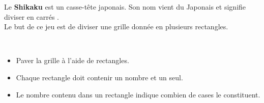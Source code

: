 \begin{changemargin}{-15mm}{-15mm}
\begin{enigme}[Shikaku]
    Le {\bf Shikaku} est un casse-tête japonais. Son nom vient du Japonais et signifie \og diviser en carrés \fg. \\
    Le but de ce jeu est de diviser une grille donnée en plusieurs rectangles. \medskip
    
       \ \\[-11mm]
       \begin{itemize}
          \item Paver la grille à l'aide de rectangles.
          \item Chaque rectangle doit contenir un nombre et un seul.
          \item Le nombre contenu dans un rectangle indique combien de cases le constituent. \medskip
       \end{itemize}


\end{enigme}
\end{changemargin}
